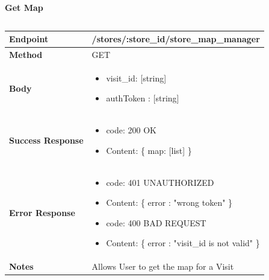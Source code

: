 \documentclass[a4paper, 12pt, oneside, table]{article}
\begin{document}
\textbf{Get Map}
\vspace{-2em}
\begin{tabularx}{0.8\textwidth} { 
  | >{\raggedright\arraybackslash}X 
  | >{\centering\arraybackslash}X 
  | >{\raggedleft\arraybackslash}X | }
 \hline

 \hline
 
\hline
\hline
 
\hline
\end{tabularx}

\begin{tabularx}{\linewidth}{| l | X |}
    
    \hline
     \textbf{Endpoint} & /stores/:store\_id/store\_map\_manager \\
    

    \hline
    \textbf{Method}  & GET   \\
    
    \hline
    \textbf{Body}  & \parbox{0.7\textwidth}{ \begin{itemize}[label={}] 
                \item visit\_id: [string]
                 \item authToken : [string]
               \end{itemize}}\\
    
    \hline
    \textbf{Success Response} & \parbox{0.7\textwidth}{ \begin{itemize}[label={}] 
                \item code: 200 OK
                 \item Content: \{ map: [list] \}
               \end{itemize}}\\
    
    \hline
    
    \hline
        \textbf{Error Response} & \parbox{0.7\textwidth}{ \begin{itemize}[label={}] 
                  \item code: 401 UNAUTHORIZED
                     \item Content: \{ error : "wrong token" \}
                   \item code: 400 BAD REQUEST
                     \item Content: \{ error : "visit\_id is not valid" \}
               \end{itemize}}\\
    
    \hline
    \textbf{Notes} & Allows User to get the map for a Visit \\

    \hline
    
\end{tabularx}
\end{document}
